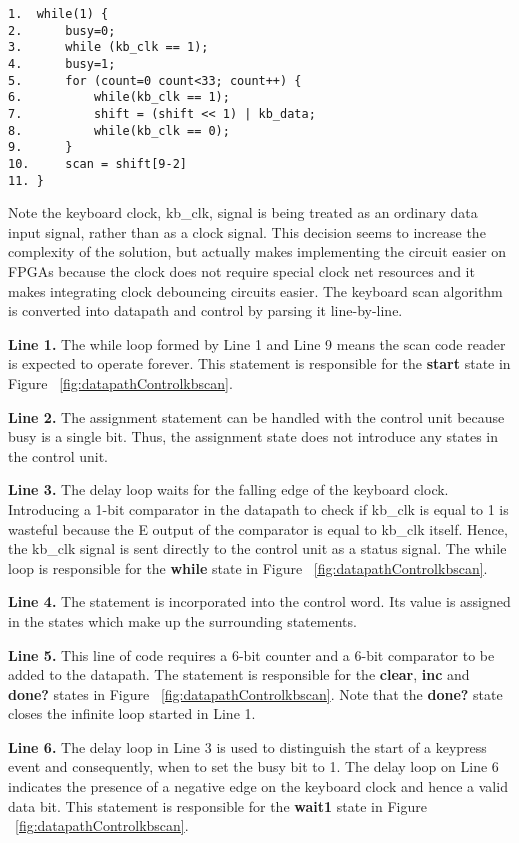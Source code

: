 \begin{verbatim}
1.  while(1) {
2.      busy=0;
3.      while (kb_clk == 1);
4.      busy=1;
5.      for (count=0 count<33; count++) {
6.          while(kb_clk == 1);
7.          shift = (shift << 1) | kb_data;
8.          while(kb_clk == 0);
9.      } 
10.     scan = shift[9-2]
11. } 
\end{verbatim}

Note the keyboard clock, kb\_clk, signal is being treated as an ordinary 
data input signal, rather than as a clock signal.  This decision seems to 
increase the complexity of the solution, but actually makes implementing 
the circuit easier on FPGAs because the clock does not require special 
clock net resources and it makes integrating
clock debouncing circuits easier.  The keyboard scan algorithm is converted
into datapath and control by parsing it line-by-line.

\textbf{ Line 1.} The while loop formed by Line 1 and Line 9 means the scan code reader 
is expected to operate forever.	This statement is responsible for the 
\textbf{ start} state in Figure ~\ref{fig:datapathControlkbscan}.

\textbf{ Line 2.} The assignment statement can be handled with the control unit
because busy is a single bit.  Thus, the assignment state does not introduce
any states in the control unit.

\textbf{ Line 3.} The delay loop waits for the falling edge of the keyboard clock.
Introducing a 1-bit comparator in the datapath to check if kb\_clk is equal
to 1 is wasteful because the E output of the comparator is equal to kb\_clk
itself.  Hence, the kb\_clk signal is sent directly to the control unit as
a status signal.  The while loop is responsible for the \textbf{ while} state 
in Figure ~\ref{fig:datapathControlkbscan}.

\textbf{ Line 4.} The statement is incorporated into the control word.  Its
value is assigned in the states which make up the surrounding statements.

\textbf{ Line 5.} This line of code requires  a 6-bit counter and a 6-bit 
comparator to be added to the datapath.  The statement is responsible 
for the \textbf{ clear}, \textbf{ inc} and \textbf{ done?} states in 
Figure ~\ref{fig:datapathControlkbscan}.  Note that the \textbf{ done?} state closes the 
infinite loop started in Line 1.

\textbf{ Line 6.} The delay loop in Line 3 is used to distinguish the start of a 
keypress event and consequently, when to set the busy bit to 1.  The 
delay loop on Line 6 indicates the presence of a negative edge on the 
keyboard clock and hence a valid data bit.  This statement is responsible 
for the \textbf{ wait1} state in Figure ~\ref{fig:datapathControlkbscan}.

